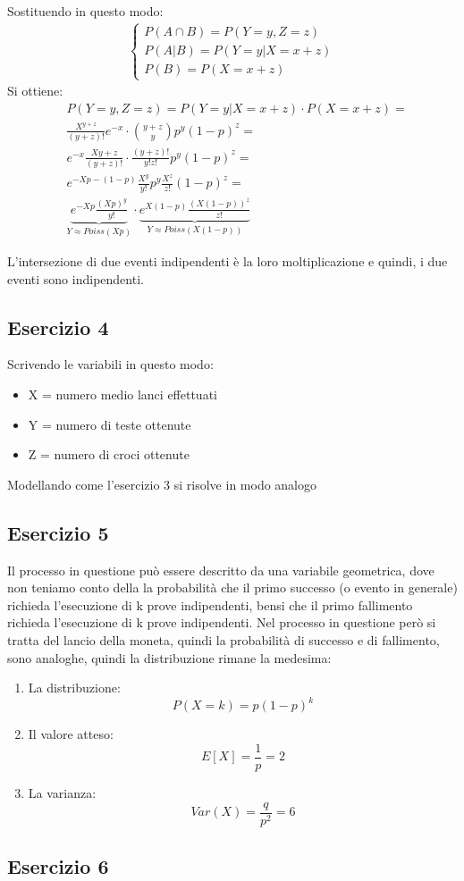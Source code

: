\documentclass[12pt]{article}
\begin{document}
Sostituendo in questo modo:
\begin{align*}
    \begin{cases}
        P(A \cap B) = P(Y=y, Z=z) \\
        P(A|B) = P(Y=y|X = x+z) \\
        P(B) = P(X = x+z)
    \end{cases}        
\end{align*}
Si ottiene:
\begin{align*}
    &P(Y=y, Z=z) = P(Y=y|X = x+z)\cdot P(X = x+z) = \\
    &\frac{X^{y+z}}{(y+z)!}e^{-x}\cdot \binom{y+z}{y}p^y(1-p)^z =\\
    &e^{-x}\frac{X{y+z}}{(y+z)!}\cdot\frac{(y+z)!}{y!z!}p^y(1-p)^z =\\
    &e^{-Xp-(1-p)}\frac{X^y}{y!}p^y\frac{X^z}{z!}(1-p)^z = \\
    &\underbrace{e^{-Xp}\frac{(Xp)^y}{y!}}_{Y \approx Poiss(Xp)}\cdot \underbrace{e^{X(1-p)}\frac{(X(1-p))^z}{z!}}_{Y \approx Poiss(X(1-p))}
\end{align*}

L'intersezione di due eventi indipendenti è la loro moltiplicazione e quindi, i due eventi sono indipendenti.

\subsection*{Esercizio 4}

Scrivendo le variabili in questo modo:
\begin{itemize}
    \item X = numero medio lanci effettuati 
    \item Y = numero di teste ottenute
    \item Z = numero di croci ottenute 
\end{itemize}

Modellando come l'esercizio 3 si risolve in modo analogo

\subsection*{Esercizio 5}
Il processo in questione può essere descritto da una variabile geometrica, dove non teniamo conto della la probabilità 
che il primo successo (o evento in generale) richieda l'esecuzione di k prove indipendenti, bensi che il primo fallimento richieda l'esecuzione
di k prove indipendenti. Nel processo in questione però si tratta del lancio della moneta, quindi la probabilità di successo e di fallimento,
sono analoghe, quindi la distribuzione rimane la medesima:
\begin{enumerate}
    \item La distribuzione:
    \[
    P(X = k) = p(1-p)^k    
    \]
    \item Il valore atteso:
    \[
    E[X] = \frac{1}{p} = 2    
    \]
    \item La varianza:
    \[
    Var(X) = \frac{q}{p^2} = 6     
    \]
\end{enumerate}

\subsection*{Esercizio 6}
\end{document}
